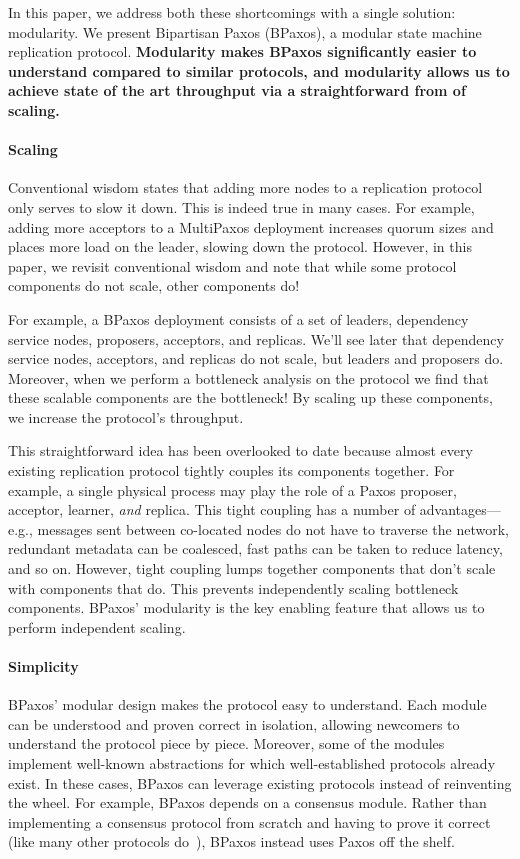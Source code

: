 In this paper, we address both these shortcomings with a single solution:
modularity. We present Bipartisan Paxos (BPaxos), a modular state machine
replication protocol. \textbf{Modularity makes BPaxos significantly easier to
understand compared to similar protocols, and modularity allows us to achieve
state of the art throughput via a straightforward from of scaling.}

\paragraph{Scaling}
Conventional wisdom states that adding more nodes to a replication protocol
only serves to slow it down. This is indeed true in many cases. For example,
adding more acceptors to a MultiPaxos deployment increases quorum sizes and
places more load on the leader, slowing down the protocol. However, in this
paper, we revisit conventional wisdom and note that while some protocol
components do not scale, other components do!

For example, a BPaxos deployment consists of a set of leaders, dependency
service nodes, proposers, acceptors, and replicas. We'll see later that
dependency service nodes, acceptors, and replicas do not scale, but leaders and
proposers do. Moreover, when we perform a bottleneck analysis on the protocol
we find that these scalable components are the bottleneck! By scaling up these
components, we increase the protocol's throughput.

This straightforward idea has been overlooked to date because almost every existing
replication protocol tightly couples its components together. For example, a
single physical process may play the role of a Paxos proposer, acceptor,
learner, \emph{and} replica. This tight coupling has a number of
advantages---e.g., messages sent between co-located nodes do not have to
traverse the network, redundant metadata can be coalesced, fast paths can be
taken to reduce latency, and so on. However, tight coupling lumps together
components that don't scale with components that do. This prevents
independently scaling bottleneck components. BPaxos' modularity is the key
enabling feature that allows us to perform independent scaling.

\paragraph{Simplicity}
BPaxos' modular design makes the protocol easy to understand. Each module can
be understood and proven correct in isolation, allowing newcomers to understand
the protocol piece by piece. Moreover, some of the modules implement well-known
abstractions for which well-established protocols already exist. In these
cases, BPaxos can leverage existing protocols instead of reinventing the wheel.
For example, BPaxos depends on a consensus module. Rather than implementing a
consensus protocol from scratch and having to prove it correct (like many other
protocols do~\cite{moraru2013there, arun2017speeding, nawab2018dpaxos}), BPaxos
instead uses Paxos off the shelf.

